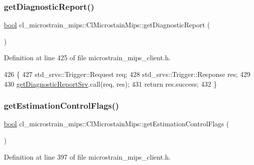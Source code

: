 \subsubsection{\texorpdfstring{get\+Diagnostic\+Report()}{getDiagnosticReport()}}
{\footnotesize\ttfamily \hyperlink{classbool}{bool} cl\+\_\+microstrain\+\_\+mips\+::\+Cl\+Microstain\+Mips\+::get\+Diagnostic\+Report (\begin{DoxyParamCaption}{ }\end{DoxyParamCaption})\hspace{0.3cm}{\ttfamily [inline]}}



Definition at line 425 of file microstrain\+\_\+mips\+\_\+client.\+h.


\begin{DoxyCode}
426     \{
427         std\_srvs::Trigger::Request req;
428         std\_srvs::Trigger::Response res;
429 
430         \hyperlink{classcl__microstrain__mips_1_1ClMicrostainMips_a3d4329c798aa4b7cab1320f35f270192}{getDiagnosticReportSrv}.call(req, res);
431         \textcolor{keywordflow}{return} res.success;
432     \}
\end{DoxyCode}
\mbox{\label{classcl__microstrain__mips_1_1ClMicrostainMips_ad0a8eda5c19617250d3392593d0c8986}} 
\subsubsection{\texorpdfstring{get\+Estimation\+Control\+Flags()}{getEstimationControlFlags()}}
{\footnotesize\ttfamily \hyperlink{classbool}{bool} cl\+\_\+microstrain\+\_\+mips\+::\+Cl\+Microstain\+Mips\+::get\+Estimation\+Control\+Flags (\begin{DoxyParamCaption}{ }\end{DoxyParamCaption})\hspace{0.3cm}{\ttfamily [inline]}}



Definition at line 397 of file microstrain\+\_\+mips\+\_\+client.\+h.


